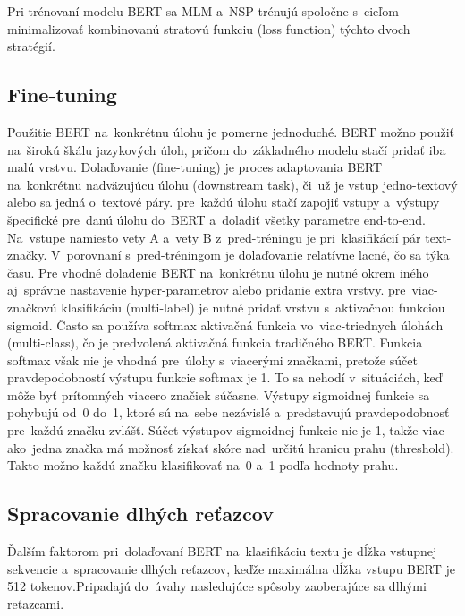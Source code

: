 Pri trénovaní modelu BERT sa MLM a~NSP trénujú spoločne s~cieľom minimalizovať kombinovanú stratovú funkciu (loss function) týchto dvoch stratégií. \cite{Horev:2019} \cite{Sun:2019} 

\subsection{Fine-tuning} \label{finetuning}

Použitie BERT na~konkrétnu úlohu je pomerne jednoduché. BERT možno použiť na~širokú škálu jazykových úloh, pričom do~základného modelu stačí pridať iba malú vrstvu. Dolaďovanie (fine-tuning) je proces adaptovania BERT na~konkrétnu nadväzujúcu úlohu (downstream task), či~už je vstup jedno-textový alebo sa jedná o~textové páry. pre~každú úlohu stačí zapojiť vstupy a~výstupy špecifické pre~danú úlohu do~BERT a~doladiť všetky parametre end-to-end. Na~vstupe namiesto vety A a~vety B z~pred-tréningu je pri~klasifikácií pár text-značky. V~porovnaní s~pred-tréningom je dolaďovanie relatívne lacné, čo sa týka času. 
Pre vhodné doladenie BERT na~konkrétnu úlohu je nutné okrem iného aj~správne nastavenie hyper-parametrov alebo pridanie extra vrstvy. pre~viac-značkovú klasifikáciu (multi-label) je nutné pridať vrstvu s~aktivačnou funkciou sigmoid. Často sa používa softmax aktivačná funkcia vo~viac-triednych  úlohách (multi-class), čo je predvolená aktivačná funkcia tradičného BERT. Funkcia softmax však nie je vhodná pre~úlohy s~viacerými značkami, pretože súčet pravdepodobností výstupu funkcie softmax je 1. To sa nehodí v~situáciách, keď môže byť prítomných viacero značiek súčasne. Výstupy sigmoidnej funkcie sa pohybujú od~0 do~1, ktoré sú na~sebe nezávislé a~predstavujú pravdepodobnosť pre~každú značku zvlášť. Súčet výstupov sigmoidnej funkcie nie je 1, takže viac ako~jedna značka má možnosť získať skóre nad~určitú hranicu prahu (threshold). Takto možno každú značku klasifikovať na~0 a~1 podľa hodnoty prahu.
\cite{Devlin:2018} \cite{Sun:2019} \cite{Tang:2020}

\subsection{Spracovanie dlhých reťazcov} \label{dlhe}

Ďalším faktorom pri~dolaďovaní BERT na~klasifikáciu textu je dĺžka vstupnej sekvencie a~spracovanie dlhých reťazcov, keďže maximálna dĺžka vstupu BERT je 512 tokenov.Pripadajú do~úvahy nasledujúce spôsoby zaoberajúce sa dlhými reťazcami.

